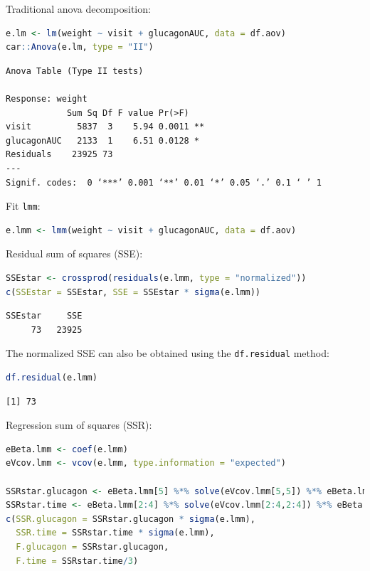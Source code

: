 \documentclass[12pt]{article}
\begin{document}
Traditional anova decomposition:
\begin{lstlisting}[language=r,numbers=none]
e.lm <- lm(weight ~ visit + glucagonAUC, data = df.aov)
car::Anova(e.lm, type = "II")
\end{lstlisting}

\label{}
\begin{verbatim}
Anova Table (Type II tests)

Response: weight
            Sum Sq Df F value Pr(>F)   
visit         5837  3    5.94 0.0011 **
glucagonAUC   2133  1    6.51 0.0128 * 
Residuals    23925 73                  
---
Signif. codes:  0 ‘***’ 0.001 ‘**’ 0.01 ‘*’ 0.05 ‘.’ 0.1 ‘ ’ 1
\end{verbatim}


Fit \texttt{lmm}:
\begin{lstlisting}[language=r,numbers=none]
e.lmm <- lmm(weight ~ visit + glucagonAUC, data = df.aov)
\end{lstlisting}

Residual sum of squares (SSE):
\begin{lstlisting}[language=r,numbers=none]
SSEstar <- crossprod(residuals(e.lmm, type = "normalized"))
c(SSEstar = SSEstar, SSE = SSEstar * sigma(e.lmm))
\end{lstlisting}

\label{}
\begin{verbatim}
SSEstar     SSE 
     73   23925
\end{verbatim}


The normalized SSE can also be obtained using the \texttt{df.residual} method:
\begin{lstlisting}[language=r,numbers=none]
df.residual(e.lmm)
\end{lstlisting}

\label{}
\begin{verbatim}
[1] 73
\end{verbatim}


Regression sum of squares (SSR):
\begin{lstlisting}[language=r,numbers=none]
eBeta.lmm <- coef(e.lmm)
eVcov.lmm <- vcov(e.lmm, type.information = "expected")

SSRstar.glucagon <- eBeta.lmm[5] %*% solve(eVcov.lmm[5,5]) %*% eBeta.lmm[5] 
SSRstar.time <- eBeta.lmm[2:4] %*% solve(eVcov.lmm[2:4,2:4]) %*% eBeta.lmm[2:4] 
c(SSR.glucagon = SSRstar.glucagon * sigma(e.lmm),
  SSR.time = SSRstar.time * sigma(e.lmm),
  F.glucagon = SSRstar.glucagon,
  F.time = SSRstar.time/3)
\end{lstlisting}
\end{document}
